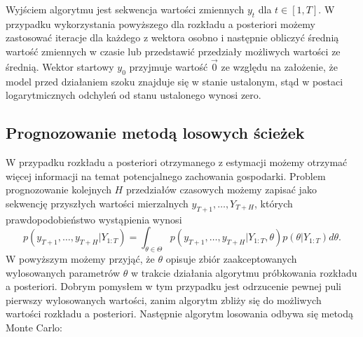 Wyjściem algorytmu jest sekwencja wartości zmiennych $y_t$ dla $t \in [1,T]$. W przypadku wykorzystania powyższego dla rozkładu a posteriori możemy zastosować iteracje dla każdego z wektora osobno i następnie obliczyć średnią wartość zmiennych w czasie lub przedstawić przedziały możliwych wartości ze średnią. Wektor startowy $y_0$ przyjmuje wartość $\vec{0}$ ze względu na założenie, że model przed działaniem szoku znajduje się w stanie ustalonym, stąd w postaci logarytmicznych odchyleń od stanu ustalonego wynosi zero.

\subsection{Prognozowanie metodą losowych ścieżek}

W przypadku rozkładu a posteriori otrzymanego z estymacji możemy otrzymać więcej informacji na temat potencjalnego zachowania gospodarki. Problem prognozowanie kolejnych $H$ przedziałów czasowych możemy zapisać jako sekwencję przyszłych wartości mierzalnych $y_{T+1},\dots,Y_{T+H}$, których prawdopodobieństwo wystąpienia wynosi
\begin{equation}
    \label{eqn:predDensity}
    p(y_{T+1}, \dots, y_{T+H}|Y_{1:T}) = \int_{\theta \in \Theta} p(y_{T+1}, \dots, y_{T+H}|Y_{1:T}, \theta) p(\theta|Y_{1:T})d\theta.
\end{equation}
W powyższym możemy przyjąć, że $\theta$ opisuje zbiór zaakceptowanych wylosowanych parametrów $\theta$ w trakcie działania algorytmu próbkowania rozkładu a posteriori. Dobrym pomysłem w tym przypadku jest odrzucenie pewnej puli pierwszy wylosowanych wartości, zanim algorytm zbliży się do możliwych wartości rozkładu a posteriori. Następnie algorytm losowania odbywa się metodą Monte Carlo:
